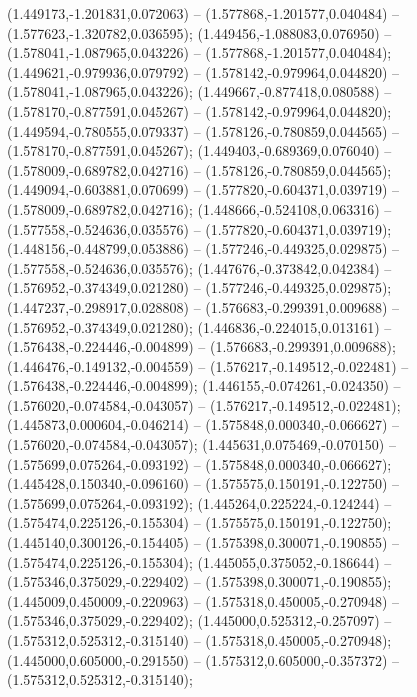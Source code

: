 (1.449173,-1.201831,0.072063) -- (1.577868,-1.201577,0.040484) -- (1.577623,-1.320782,0.036595);
 (1.449456,-1.088083,0.076950) -- (1.578041,-1.087965,0.043226) -- (1.577868,-1.201577,0.040484);
 (1.449621,-0.979936,0.079792) -- (1.578142,-0.979964,0.044820) -- (1.578041,-1.087965,0.043226);
 (1.449667,-0.877418,0.080588) -- (1.578170,-0.877591,0.045267) -- (1.578142,-0.979964,0.044820);
 (1.449594,-0.780555,0.079337) -- (1.578126,-0.780859,0.044565) -- (1.578170,-0.877591,0.045267);
 (1.449403,-0.689369,0.076040) -- (1.578009,-0.689782,0.042716) -- (1.578126,-0.780859,0.044565);
 (1.449094,-0.603881,0.070699) -- (1.577820,-0.604371,0.039719) -- (1.578009,-0.689782,0.042716);
 (1.448666,-0.524108,0.063316) -- (1.577558,-0.524636,0.035576) -- (1.577820,-0.604371,0.039719);
 (1.448156,-0.448799,0.053886) -- (1.577246,-0.449325,0.029875) -- (1.577558,-0.524636,0.035576);
 (1.447676,-0.373842,0.042384) -- (1.576952,-0.374349,0.021280) -- (1.577246,-0.449325,0.029875);
 (1.447237,-0.298917,0.028808) -- (1.576683,-0.299391,0.009688) -- (1.576952,-0.374349,0.021280);
 (1.446836,-0.224015,0.013161) -- (1.576438,-0.224446,-0.004899) -- (1.576683,-0.299391,0.009688);
 (1.446476,-0.149132,-0.004559) -- (1.576217,-0.149512,-0.022481) -- (1.576438,-0.224446,-0.004899);
 (1.446155,-0.074261,-0.024350) -- (1.576020,-0.074584,-0.043057) -- (1.576217,-0.149512,-0.022481);
 (1.445873,0.000604,-0.046214) -- (1.575848,0.000340,-0.066627) -- (1.576020,-0.074584,-0.043057);
 (1.445631,0.075469,-0.070150) -- (1.575699,0.075264,-0.093192) -- (1.575848,0.000340,-0.066627);
 (1.445428,0.150340,-0.096160) -- (1.575575,0.150191,-0.122750) -- (1.575699,0.075264,-0.093192);
 (1.445264,0.225224,-0.124244) -- (1.575474,0.225126,-0.155304) -- (1.575575,0.150191,-0.122750);
 (1.445140,0.300126,-0.154405) -- (1.575398,0.300071,-0.190855) -- (1.575474,0.225126,-0.155304);
 (1.445055,0.375052,-0.186644) -- (1.575346,0.375029,-0.229402) -- (1.575398,0.300071,-0.190855);
 (1.445009,0.450009,-0.220963) -- (1.575318,0.450005,-0.270948) -- (1.575346,0.375029,-0.229402);
 (1.445000,0.525312,-0.257097) -- (1.575312,0.525312,-0.315140) -- (1.575318,0.450005,-0.270948);
 (1.445000,0.605000,-0.291550) -- (1.575312,0.605000,-0.357372) -- (1.575312,0.525312,-0.315140);
